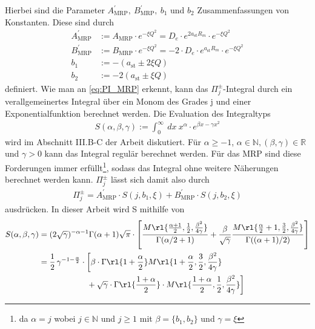 %
Hierbei sind die Parameter $A^\prime_\text{MRP},\ B^\prime_\text{MRP},\ b_1$ 
und $b_2$ Zusammenfassungen von Konstanten. Diese sind durch
%
\begin{align}
A^\prime_\text{MRP}&:=A_\text{MRP}\cdot e^{-\xi Q^2}= D_e\cdot 
e^{2a_\text{st}R_m} \cdot 
e^{-\xi Q^2}\\
B^\prime_\text{MRP}&:=B_\text{MRP}\cdot e^{-\xi Q^2}= -2\cdot D_e\cdot 
e^{a_\text{st}R_m} 
\cdot e^{-\xi Q^2}\\
b_1 &:=-(a_\text{st}\pm 2\xi Q)\\
b_2 &:=-2(a_\text{st} \pm \xi Q )
\end{align}
%
definiert. Wie man an \ref{eq:PI_MRP} erkennt, kann das $\Pi^\pm_j$-Integral 
durch ein verallgemeinertes Integral über ein Monom des Grades j und einer 
Exponentialfunktion berechnet werden. Die Evaluation des Integraltyps
%
\begin{align}\label{eq:def:S}
S(\alpha,\beta,\gamma):=\int_{0}^{\infty}\ dx\ x^\alpha\cdot e^{\beta x - 
\gamma 
x^2}
\end{align}
%
wird im Abschnitt III.B-C der Arbeit \cite{av:1a} diskutiert. Für 
$\alpha\geq-1$, $\alpha\in \mathbb{N}, (\beta,\gamma)\in\mathbb{R}$ und $\gamma 
>0$  kann das Integral 
regulär berechnet werden. Für das MRP sind diese Forderungen immer 
erfüllt\footnote{da $\alpha=j$ wobei $j\in \mathbb{N}$ und $j\geq1$ mit 
$\beta=\{b_1,b_2\}$ und $\gamma=\xi$}, sodass das Integral ohne 
weitere Näherungen berechnet werden kann. $\Pi_j^\pm$ lässt sich damit 
also 
durch
%
\begin{align}\label{eq:PIinS_MRP}
\Pi^\pm_j=A^\prime_\text{MRP}\cdot 
S(j,b_1,\xi)+B^\prime_\text{MRP}\cdot 
S(j,b_2,\xi)
\end{align}
%
ausdrücken. In dieser Arbeit wird S mithilfe von 
%
\begin{align}\nonumber
S(\alpha,\beta,\gamma)  
&=(2\sqrt{\gamma})^{-\alpha-1}\Gamma(\alpha+1)\sqrt{\pi}\cdot
\left[\frac{M\rl{\frac{\alpha+1}{2},\frac{1}{2},\frac{\beta^2}{4\gamma}}}{\Gamma(\alpha/2+1)}
+\frac{\beta}{\sqrt{\gamma}} 
\frac{M\rl{\frac{\alpha}{2}+1,\frac{3}{2},\frac{\beta^2}{4\gamma}}}{\Gamma((\alpha+1)/2)}\right]\\\nonumber
%
&=\frac{1}{2}\, \gamma^{-1 - \frac{\alpha}{2}}\cdot \bigg[\beta\cdot 
\Gamma\rl{1 + \frac{\alpha}{2}}M\rl{1 + \frac{\alpha}{2}, \frac{3}{2}, 
\frac{\beta^2}{4\gamma}} \\ \label{eq:S,alpha>0}
&\qquad \qquad \qquad +\sqrt{\gamma}\cdot \Gamma\rl{\frac{1+\alpha}{2}}\cdot 
M\rl{\frac{1 + 
\alpha}{2}, 
\frac{1}{2},\frac{\beta^2}{4\gamma}} \bigg]
\end{align}

